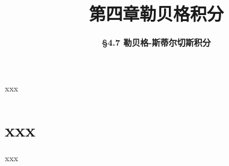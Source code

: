 


\title[第四章\\
勒贝格积分]{\texorpdfstring{\LARGE \bfseries 第四章\quad 勒贝格积分}{第四章 勒贝格积分}} %
\author[\S 4.7\\
勒贝格-斯蒂尔切斯积分] %
{\Large \bfseries \S 4.7 勒贝格-斯蒂尔切斯积分}
\date{}





\begin{frame}

\titlepage %

\end{frame}





\begin{frame}{xxx}



\end{frame}


\section{xxx}


\begin{frame}{xxx}


\end{frame}



